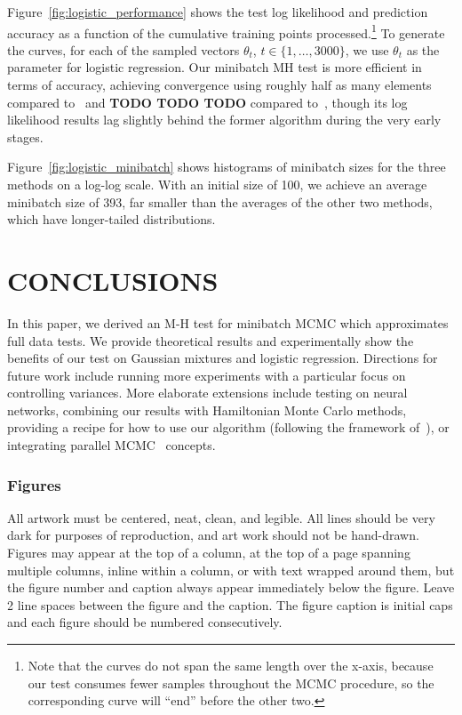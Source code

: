 \documentclass[twoside]{article} \usepackage{aistats2017}
\begin{document}
Figure~\ref{fig:logistic_performance} shows the test log likelihood and
prediction accuracy as a function of the cumulative training points
processed.\footnote{Note that the curves do not span the same length over the
x-axis, because our test consumes fewer samples throughout the MCMC procedure,
so the corresponding curve will ``end'' before the other two.} To generate the
curves, for each of the sampled vectors $\theta_t$, $t\in\{1,\ldots,3000\}$, we
use $\theta_t$ as the parameter for logistic regression.  Our minibatch MH test
is more efficient in terms of accuracy, achieving convergence using roughly half
as many elements compared to~\citet{cutting_mh_2014} and \textbf{TODO TODO TODO}
compared to~\citet{icml2014c1_bardenet14}, though its log likelihood results lag
slightly behind the former algorithm during the very early stages.

Figure~\ref{fig:logistic_minibatch} shows histograms of minibatch sizes for the
three methods on a log-log scale. With an initial size of 100, we achieve an
average minibatch size of 393, far smaller than the averages of the other two
methods, which have longer-tailed distributions.



\section{CONCLUSIONS}\label{sec:conclusion}

In this paper, we derived an M-H test for minibatch MCMC which approximates full
data tests. We provide theoretical results and experimentally show the benefits
of our test on Gaussian mixtures and logistic regression. Directions for future
work include running more experiments with a particular focus on controlling
variances.  More elaborate extensions include testing on neural networks,
combining our results with Hamiltonian Monte Carlo methods, providing a recipe
for how to use our algorithm (following the framework of~\citet{sgmcmc_2015}),
or integrating parallel MCMC~\citep{conf/uai/AngelinoKWSA14,conf/icml/AhnSW14}
concepts.





\iffalse
\subsubsection{Figures}

All artwork must be centered, neat, clean, and legible.  All lines
should be very dark for purposes of reproduction, and art work should
not be hand-drawn.  Figures may appear at the top of a column, at the
top of a page spanning multiple columns, inline within a column, or
with text wrapped around them, but the figure number and caption
always appear immediately below the figure.  Leave 2 line spaces
between the figure and the caption. The figure caption is initial caps
and each figure should be numbered consecutively.
\end{document}
